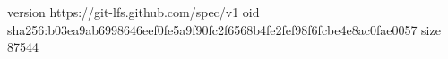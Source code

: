 version https://git-lfs.github.com/spec/v1
oid sha256:b03ea9ab6998646eef0fe5a9f90fc2f6568b4fe2fef98f6fcbe4e8ac0fae0057
size 87544
